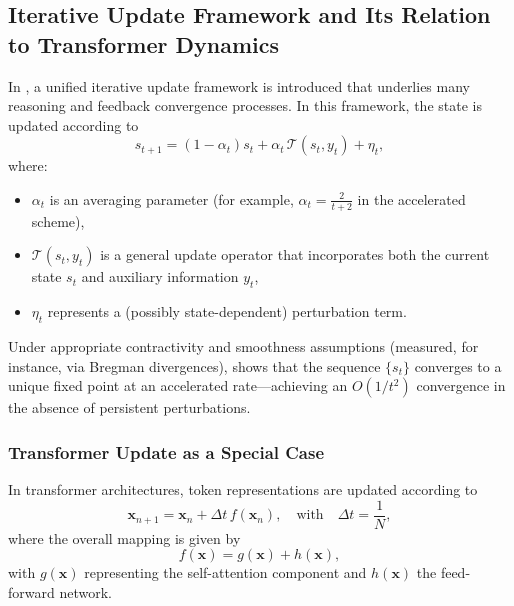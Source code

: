 \subsection{Iterative Update Framework and Its Relation to Transformer Dynamics}
\label{sec:iterative-update-framework}

In \cite{feinashley2025iterate}, a unified iterative update framework is introduced that underlies many reasoning and feedback convergence processes. In this framework, the state is updated according to
\begin{equation}
  s_{t+1} = (1-\alpha_t) s_t + \alpha_t\, \mathcal{T}(s_t, y_t) + \eta_t,
  \label{eq:iterative-update}
\end{equation}
where:
\begin{itemize}[leftmargin=2em]
    \item \(\alpha_t\) is an averaging parameter (for example, \(\alpha_t = \tfrac{2}{t+2}\) in the accelerated scheme),
    \item \(\mathcal{T}(s_t, y_t)\) is a general update operator that incorporates both the current state \(s_t\) and auxiliary information \(y_t\),
    \item \(\eta_t\) represents a (possibly state-dependent) perturbation term.
\end{itemize}

Under appropriate contractivity and smoothness assumptions (measured, for instance, via Bregman divergences), \cite{feinashley2025iterate} shows that the sequence \(\{s_t\}\) converges to a unique fixed point at an accelerated rate—achieving an \(O(1/t^2)\) convergence in the absence of persistent perturbations.

\subsubsection{Transformer Update as a Special Case}
\label{subsec:transformer-special-case}

In transformer architectures, token representations are updated according to
\begin{equation}
  \mathbf{x}_{n+1} = \mathbf{x}_n + \Delta t\, f(\mathbf{x}_n), \quad \text{with} \quad \Delta t = \frac{1}{N},
  \label{eq:transformer-update}
\end{equation}
where the overall mapping is given by
\[
f(\mathbf{x}) = g(\mathbf{x}) + h(\mathbf{x}),
\]
with \(g(\mathbf{x})\) representing the self-attention component and \(h(\mathbf{x})\) the feed-forward network.

